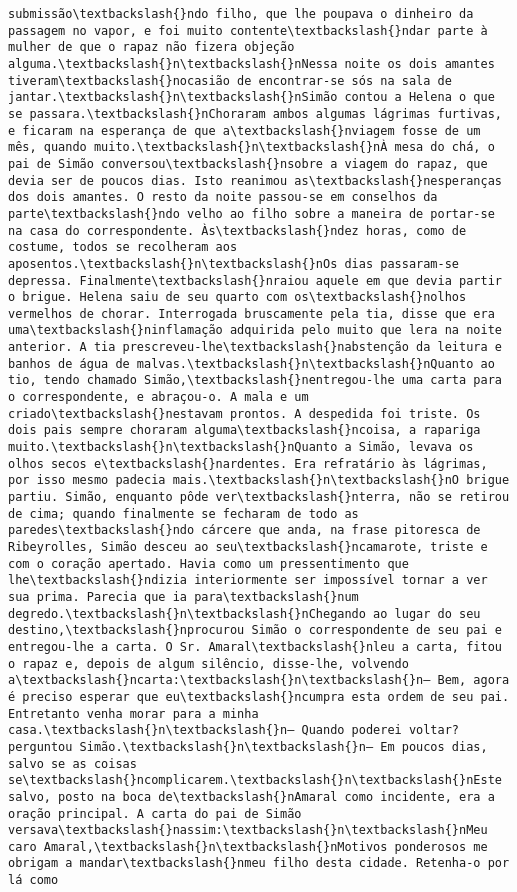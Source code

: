 \begin{Verbatim}[commandchars=\\\{\}]
submissão\textbackslash{}ndo filho, que lhe poupava o dinheiro da passagem no vapor, e foi muito contente\textbackslash{}ndar parte à mulher de que o rapaz não fizera objeção alguma.\textbackslash{}n\textbackslash{}nNessa noite os dois amantes tiveram\textbackslash{}nocasião de encontrar-se sós na sala de jantar.\textbackslash{}n\textbackslash{}nSimão contou a Helena o que se passara.\textbackslash{}nChoraram ambos algumas lágrimas furtivas, e ficaram na esperança de que a\textbackslash{}nviagem fosse de um mês, quando muito.\textbackslash{}n\textbackslash{}nÀ mesa do chá, o pai de Simão conversou\textbackslash{}nsobre a viagem do rapaz, que devia ser de poucos dias. Isto reanimou as\textbackslash{}nesperanças dos dois amantes. O resto da noite passou-se em conselhos da parte\textbackslash{}ndo velho ao filho sobre a maneira de portar-se na casa do correspondente. Às\textbackslash{}ndez horas, como de costume, todos se recolheram aos aposentos.\textbackslash{}n\textbackslash{}nOs dias passaram-se depressa. Finalmente\textbackslash{}nraiou aquele em que devia partir o brigue. Helena saiu de seu quarto com os\textbackslash{}nolhos vermelhos de chorar. Interrogada bruscamente pela tia, disse que era uma\textbackslash{}ninflamação adquirida pelo muito que lera na noite anterior. A tia prescreveu-lhe\textbackslash{}nabstenção da leitura e banhos de água de malvas.\textbackslash{}n\textbackslash{}nQuanto ao tio, tendo chamado Simão,\textbackslash{}nentregou-lhe uma carta para o correspondente, e abraçou-o. A mala e um criado\textbackslash{}nestavam prontos. A despedida foi triste. Os dois pais sempre choraram alguma\textbackslash{}ncoisa, a rapariga muito.\textbackslash{}n\textbackslash{}nQuanto a Simão, levava os olhos secos e\textbackslash{}nardentes. Era refratário às lágrimas, por isso mesmo padecia mais.\textbackslash{}n\textbackslash{}nO brigue partiu. Simão, enquanto pôde ver\textbackslash{}nterra, não se retirou de cima; quando finalmente se fecharam de todo as paredes\textbackslash{}ndo cárcere que anda, na frase pitoresca de Ribeyrolles, Simão desceu ao seu\textbackslash{}ncamarote, triste e com o coração apertado. Havia como um pressentimento que lhe\textbackslash{}ndizia interiormente ser impossível tornar a ver sua prima. Parecia que ia para\textbackslash{}num degredo.\textbackslash{}n\textbackslash{}nChegando ao lugar do seu destino,\textbackslash{}nprocurou Simão o correspondente de seu pai e entregou-lhe a carta. O Sr. Amaral\textbackslash{}nleu a carta, fitou o rapaz e, depois de algum silêncio, disse-lhe, volvendo a\textbackslash{}ncarta:\textbackslash{}n\textbackslash{}n— Bem, agora é preciso esperar que eu\textbackslash{}ncumpra esta ordem de seu pai. Entretanto venha morar para a minha casa.\textbackslash{}n\textbackslash{}n— Quando poderei voltar? perguntou Simão.\textbackslash{}n\textbackslash{}n— Em poucos dias, salvo se as coisas se\textbackslash{}ncomplicarem.\textbackslash{}n\textbackslash{}nEste salvo, posto na boca de\textbackslash{}nAmaral como incidente, era a oração principal. A carta do pai de Simão versava\textbackslash{}nassim:\textbackslash{}n\textbackslash{}nMeu caro Amaral,\textbackslash{}n\textbackslash{}nMotivos ponderosos me obrigam a mandar\textbackslash{}nmeu filho desta cidade. Retenha-o por lá como 
\end{Verbatim}
